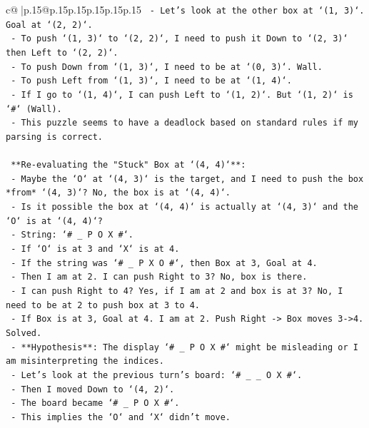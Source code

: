 \documentclass{article}
\begin{document}
{\begin{supertabular}{c@{$\;$}|p{.15\linewidth}@{}p{.15\linewidth}p{.15\linewidth}p{.15\linewidth}p{.15\linewidth}p{.15\linewidth}}
{{{\texttt{    {-}   Let's look at the other box at `(1, 3)`. Goal at `(2, 2)`.} \\
\texttt{    {-}   To push `(1, 3)` to `(2, 2)`, I need to push it Down to `(2, 3)` then Left to `(2, 2)`.} \\
\texttt{    {-}   To push Down from `(1, 3)`, I need to be at `(0, 3)`. Wall.} \\
\texttt{    {-}   To push Left from `(1, 3)`, I need to be at `(1, 4)`.} \\
\texttt{    {-}   If I go to `(1, 4)`, I can push Left to `(1, 2)`. But `(1, 2)` is `\#` (Wall).} \\
\texttt{    {-}   This puzzle seems to have a deadlock based on standard rules if my parsing is correct.} \\
\\ 
\texttt{    **Re{-}evaluating the "Stuck" Box at `(4, 4)`**:} \\
\texttt{    {-}   Maybe the `O` at `(4, 3)` is the target, and I need to push the box *from* `(4, 3)`? No, the box is at `(4, 4)`.} \\
\texttt{    {-}   Is it possible the box at `(4, 4)` is actually at `(4, 3)` and the `O` is at `(4, 4)`?} \\
\texttt{        {-}   String: `\# \_ P O X \#`.} \\
\texttt{        {-}   If `O` is at 3 and `X` is at 4.} \\
\texttt{        {-}   If the string was `\# \_ P X O \#`, then Box at 3, Goal at 4.} \\
\texttt{        {-}   Then I am at 2. I can push Right to 3? No, box is there.} \\
\texttt{        {-}   I can push Right to 4? Yes, if I am at 2 and box is at 3? No, I need to be at 2 to push box at 3 to 4.} \\
\texttt{        {-}   If Box is at 3, Goal at 4. I am at 2. Push Right {-}> Box moves 3{-}>4. Solved.} \\
\texttt{        {-}   **Hypothesis**: The display `\# \_ P O X \#` might be misleading or I am misinterpreting the indices.} \\
\texttt{        {-}   Let's look at the previous turn's board: `\# \_ \_ O X \#`.} \\
\texttt{        {-}   Then I moved Down to `(4, 2)`.} \\
\texttt{        {-}   The board became `\# \_ P O X \#`.} \\
\texttt{        {-}   This implies the `O` and `X` didn't move.} \\
}}}
\end{supertabular}}
\end{document}
